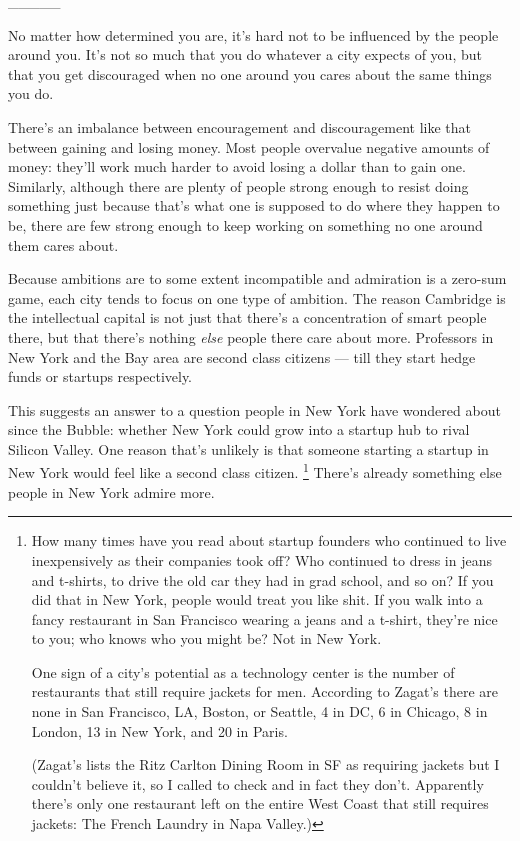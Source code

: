 \_\_\_\_\_

No matter how determined you are, it's hard not to be influenced by the
people around you. It's not so much that you do whatever a city expects
of you, but that you get discouraged when no one around you cares about
the same things you do.

There's an imbalance between encouragement and discouragement like that
between gaining and losing money. Most people overvalue negative amounts
of money: they'll work much harder to avoid losing a dollar than to gain
one. Similarly, although there are plenty of people strong enough to
resist doing something just because that's what one is supposed to do
where they happen to be, there are few strong enough to keep working on
something no one around them cares about.

Because ambitions are to some extent incompatible and admiration is a
zero-sum game, each city tends to focus on one type of ambition. The
reason Cambridge is the intellectual capital is not just that there's a
concentration of smart people there, but that there's nothing
\emph{else} people there care about more. Professors in New York and the
Bay area are second class citizens --- till they start hedge funds or
startups respectively.

This suggests an answer to a question people in New York have wondered
about since the Bubble: whether New York could grow into a startup hub
to rival Silicon Valley. One reason that's unlikely is that someone
starting a startup in New York would feel like a second class citizen.
\footnote{How many times have you read about startup founders who
continued to live inexpensively as their companies took off? Who
continued to dress in jeans and t-shirts, to drive the old car they had
in grad school, and so on? If you did that in New York, people would
treat you like shit. If you walk into a fancy restaurant in San
Francisco wearing a jeans and a t-shirt, they're nice to you; who knows
who you might be? Not in New York.

One sign of a city's potential as a technology center is the number of
restaurants that still require jackets for men. According to Zagat's
there are none in San Francisco, LA, Boston, or Seattle, 4 in DC, 6 in
Chicago, 8 in London, 13 in New York, and 20 in Paris.

(Zagat's lists the Ritz Carlton Dining Room in SF as requiring jackets
but I couldn't believe it, so I called to check and in fact they don't.
Apparently there's only one restaurant left on the entire West Coast
that still requires jackets: The French Laundry in Napa Valley.)} There's already something else people in New
York admire more.


